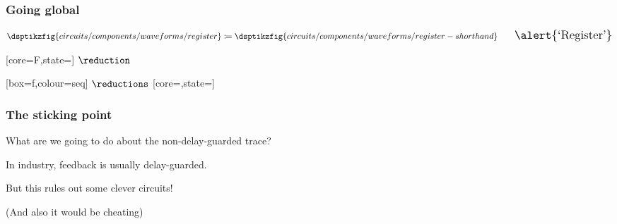 \begin{frame}
    \frametitle{Going global}

    \centering
    \Large

    \await

    \normalsize
    \begin{gather*}
        \dsptikzfig{circuits/components/waveforms/register}
        \coloneqq
        \dsptikzfig{circuits/components/waveforms/register-shorthand}
        \qquad
        \Large
        \text{\alert{`Register'}}
    \end{gather*}

    \vspace{1em}

    \await

    [core=F,state=]
    \Large\(\reduction\)\normalsize

    \await

    [box=f,colour=seq]
    \Large\(\reductions\)\normalsize
    [core=,state=]

\end{frame}
\begin{frame}
    \frametitle{The sticking point}

    \centering

    \Large

    What are we going to do about the non-delay-guarded trace?

    \await

    In industry, feedback is usually \alert{delay-guarded}.

    \await

    But this rules out some \alert{clever} circuits!

    \normalsize

    \vspace{1em}


    \await

    \vspace{1em}

    \scriptsize
    (And also it would be cheating)

\end{frame}
